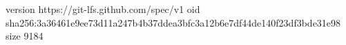 version https://git-lfs.github.com/spec/v1
oid sha256:3a36461e9ee73d11a247b4b37ddea3bfc3a12b6e7df44de140f23df3bde31e98
size 9184
